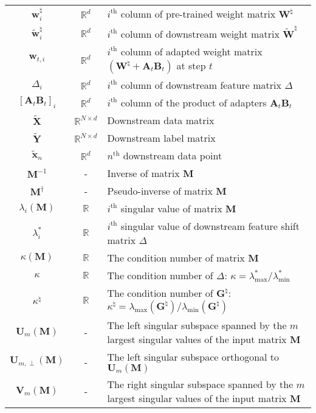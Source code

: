 \documentclass[11pt]{article}
\begin{document}
\begin{table}[h!]
\begin{tabular}{c|c|l}
$\bm w^\natural_i$ & $\mathbb{R}^d$ & $i^\text{th}$ column of pre-trained weight matrix $\bm W^\natural$ \\
$\widetilde{\bm w}^\natural_i$ & $\mathbb{R}^d$ & $i^\text{th}$ column of downstream weight matrix $\widetilde{\bm W}^\natural$ \\
$\bm w_{t,i}$ & $\mathbb{R}^d$ & $i^\text{th}$ column of adapted weight matrix $\left(\bm W^\natural+\bm A_t \bm B_t\right)$ at step $t$ \\
$\Delta_{i}$ & $\mathbb{R}^d$ & $i^\text{th}$ column of downstream feature matrix $\Delta$\\
$[\bm A_t \bm B_t]_i$ & $\mathbb{R}^d$ & $i^\text{th}$ column of the product of adapters $\bm A_t \bm B_t$\\
$\widetilde{\bm X}$ & $\mathbb{R}^{N\times d}$ & Downstream data matrix\\
$\widetilde{\bm Y}$ & $\mathbb{R}^{N\times d}$ & Downstream label matrix\\
$\widetilde{\bm x}_n$ & $\mathbb{R}^d$ & $n^\text{th}$ downstream data point\\
\hline
$\mathbf{M}^{-1}$ & - & Inverse of matrix $\mathbf{M}$ \\
$\mathbf{M}^\dagger$ & - & Pseudo-inverse of matrix $\mathbf{M}$ \\
$\lambda_i\left(\mathbf{M}\right)$ & $\mathbb{R}$ & $i^\text{th}$ singular value of matrix $\mathbf{M}$ \\
$\lambda_i^*$ & $\mathbb{R}$ & $i^\text{th}$ singular value of downstream feature shift matrix $\Delta$ \\
$\kappa\left(\mathbf{M}\right)$ & $\mathbb{R}$ & The condition number of matrix $\mathbf{M}$ \\
$\kappa$ & $\mathbb{R}$ & The condition number of $\Delta$: $\kappa=\lambda_{\max}^*/\lambda^*_{\min}$ \\
$\kappa^{\natural}$ & $\mathbb{R}$ & The condition number of $\mathbf{G}^\natural$: $ \kappa^{\natural} =\lambda_{\max}\left(\mathbf{G}^\natural\right)/\lambda_{\min}\left(\mathbf{G}^\natural\right)$ \\
$\bm U_{m}\left(\mathbf{M}\right)$ & - & The left singular subspace spanned by the $m$ largest singular values of the input matrix $\mathbf{M}$\\
$\bm U_{m,\perp}\left(\mathbf{M}\right)$ & - & The left singular subspace orthogonal to $\bm U_{m}\left(\mathbf{M}\right)$\\
$\bm V_{m}\left(\mathbf{M}\right)$ & - & The right singular subspace spanned by the $m$ largest singular values of the input matrix $\mathbf{M}$\\

\end{tabular}
\end{table}
\end{document}

